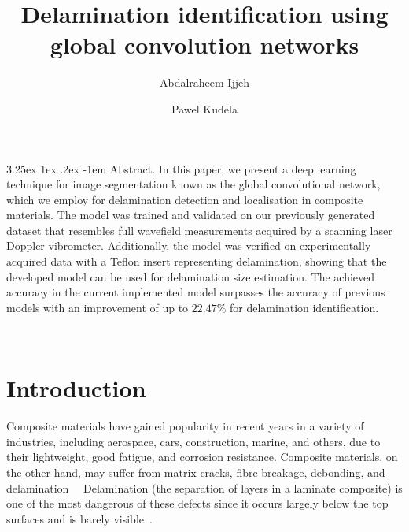 \documentclass[runningheads]{llncs}
\makeatletter
\renewcommand\paragraph{\@startsection{paragraph}{4}{\z@}%
                                    {3.25ex \@plus1ex \@minus.2ex}%
                                    {-1em}%
                                    {\normalfont\normalsize\bfseries}}
\makeatother
\begin{document}
%
\title{Delamination identification using global convolution networks}
%
%
\author{Abdalraheem Ijjeh \and
Pawel Kudela}
%
%
%
\maketitle              %
%
\paragraph{Abstract.}
In this paper, we present a deep learning technique for image segmentation known as the global convolutional network, which we employ for delamination detection and localisation in composite materials.
The model was trained and validated on our previously generated dataset that resembles full wavefield measurements acquired by a scanning laser Doppler vibrometer.
Additionally, the model was verified on experimentally acquired data with a Teflon insert representing delamination, showing that the developed model can be used for delamination size estimation.
The achieved accuracy in the current implemented model surpasses the accuracy of previous models with an improvement of up to $22.47\%$ for delamination identification.


%
\\[2em]

\section{Introduction}
Composite materials have gained popularity in recent years in a variety of industries, including aerospace, cars, construction, marine, and others, due to their lightweight, good fatigue, and corrosion resistance.
Composite materials, on the other hand, may suffer from matrix cracks, fibre breakage, debonding, and delamination~\cite{ip2004delamination}~\cite{smith2009composite}
Delamination (the separation of layers in a laminate composite) is one of the most dangerous of these defects since it occurs largely below the top surfaces and is barely visible~\cite{Cai2012}.
\end{document}
